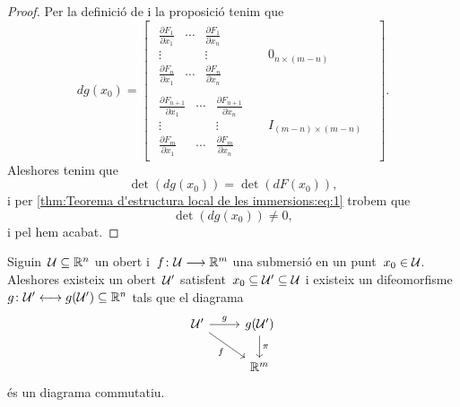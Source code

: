 \documentclass[../../main.tex]{subfiles}
\begin{document}
\begin{proof}
        Per la definició de  i la proposició  tenim que
        \[dg(x_{0})=\left[\begin{array}{c|ccc}
            \begin{matrix}
                \frac{\partial F_{1}}{\partial x_{1}} & \cdots & \frac{\partial F_{1}}{\partial x_{n}} \\
                \vdots & & \vdots \\
                \frac{\partial F_{n}}{\partial x_{1}} & \cdots & \frac{\partial F_{n}}{\partial x_{n}}
            \end{matrix} & & 0_{n\times(m-n)} & \\ \hline
            \begin{matrix}
                \frac{\partial F_{n+1}}{\partial x_{1}} & \cdots & \frac{\partial F_{n+1}}{\partial x_{n}} \\
                \vdots & & \vdots \\
                \frac{\partial F_{m}}{\partial x_{1}} & \cdots & \frac{\partial F_{m}}{\partial x_{n}}
            \end{matrix} & & I_{(m-n)\times(m-n)} &
        \end{array}\right].\]
        Aleshores tenim que
        \[
            \det(dg(x_{0}))=\det(dF(x_{0})),
        \]
        i per \eqref{thm:Teorema d'estructura local de les immersions:eq:1} trobem que
        \[
            \det(dg(x_{0}))\neq0,
        \]
        i pel  hem acabat.
    \end{proof}
    \begin{theorem}
        \label{thm:Teorema d'estructura local de les submersions}
        Siguin~\(\mathcal{U}\subseteq\mathbb{R}^{n}\) un obert i~\(f\colon\mathcal{U}\longrightarrow\mathbb{R}^{m}\) una submersió en un punt~\(x_{0}\in\mathcal{U}\).
        Aleshores existeix un obert~\(\mathcal{U}'\) satisfent~\(x_{0}\subseteq\mathcal{U}'\subseteq\mathcal{U}\) i existeix un difeomorfisme~\(g\colon\mathcal{U}'\longleftrightarrow g(\mathcal{U}')\subseteq\mathbb{R}^{n}\) tals que el diagrama
        \[\begin{tikzcd}
            \obert{U}' \arrow{r}{g} \arrow[swap]{dr}{f} & g(\obert{U}') \arrow{d}{\pi} \\
            & \mathbb{R}^{m}
        \end{tikzcd}\]
        és un diagrama commutatiu.
    \end{theorem}
\end{document}
